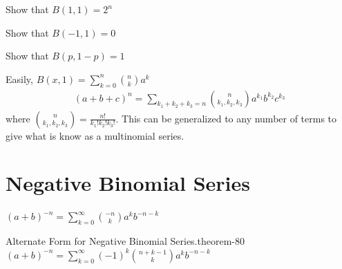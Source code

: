 \documentclass[10pt,]{book}
\numberwithin{equation}{section}
\begin{document}
\par
\hypertarget{p-1542}{}%
Show that \(B(1,1) = 2^n\)%
\par
\hypertarget{p-1543}{}%
Show that \(B(-1,1) = 0\)%
\par
\hypertarget{p-1544}{}%
Show that \(B(p,1-p) = 1\)%
\par
\hypertarget{p-1545}{}%
Easily, \(B(x,1) = \sum_{k=0}^{n} {\binom{n}{k} a^k}\)%
%
\begin{gather*}
(a+b+c)^n = \sum_{k_1+k_2+k_3=n}^{} {\binom{n}{k_1,k_2,k_3} a^{k_1} b^{k_2} c^{k_3}} 
\end{gather*}
\hypertarget{p-1546}{}%
where \(\binom{n}{k_1,k_2,k_3} = \frac{n!}{k_1!k_2!k_3!}\). This can be generalized to any number of terms to give what is know as a multinomial series.%
%
%
\typeout{************************************************}
\typeout{************************************************}
%
\section[{Negative Binomial Series}]{Negative Binomial Series}\label{section-81}
\hypertarget{p-1547}{}%
\((a+b)^{-n} = \sum_{k=0}^{\infty} {\binom{-n}{k} a^k b^{-n-k}}\)%
\begin{theorem}{Alternate Form for Negative Binomial Series.}{}{theorem-80}%
\hypertarget{p-1548}{}%
\((a+b)^{-n} = \sum_{k=0}^{\infty} {(-1)^k \binom{n+k-1}{k} a^k b^{-n-k}}\)%
\end{theorem}
\end{document}
